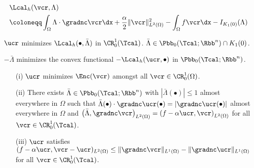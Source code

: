 \begin{frame}
  \begin{align*}
    &\Lcal_h(\vcr,\Lambda) \\
    &\coloneqq \int_\Omega\Lambda\cdot\gradnc\vcr\dx +
    \frac{\alpha}{2}\Vert \vcr\Vert^2_{L^2(\Omega)} -\int_\Omega f\vcr\dx
    - I_{K_1(0)}(\Lambda)
  \end{align*}
  
    \medskip
  {  
  $\ucr$ minimizes $\Lcal_h(\bullet, \bar\Lambda)$ in $\CR^1_0(\Tcal)$.
  $\bar\Lambda\in\Pbb_0(\Tcal;\Rbb^n)\cap K_1(0)$.}

  \medskip

  {  
  $-\bar\Lambda$ minimizes  the convex functional $-\Lcal_h(\ucr,\bullet)$ in
  $\Pbb_0(\Tcal;\Rbb^n)$.}
  
  \pause
  \begin{block}{}
  \begin{itemize}
    \item[(i)] $\ucr$ minimizes $\Enc(\vcr)$ amongst all $\vcr\in
      \CR^1_0(\Omega)$.
    \item[(ii)] There exists
      $\bar\Lambda\in\Pbb_0(\Tcal;\Rbb^n)$ with $|\bar\Lambda(\bullet)|\leq 1$
      almost everywhere in $\Omega$ such that
      {$\bar\Lambda(\bullet)\cdot\gradnc\ucr(\bullet)
        =
        |\gradnc\ucr(\bullet)|$} almost everywhere in 
        $\Omega$ and 
        {$\left(\bar\Lambda,\gradnc\vcr\right)_{L^2(\Omega)}
        = \left(f-\alpha\ucr, \vcr\right)_{L^2(\Omega)}$}
        for all $\vcr\in\CR^1_0(\Tcal)$.
      \pause
      \pause
      \pause
    \item[(iii)] $\ucr$ satisfies
      $
        (f-\alpha\ucr,\vcr-\ucr)_{L^2(\Omega)}\leq
        \Vert\gradnc\vcr\Vert_{L^1(\Omega)} -
        \Vert\gradnc\ucr\Vert_{L^1(\Omega)}
        $
      for all $\vcr\in\CR^1_0(\Tcal)$.
  \end{itemize}
    
  \end{block}
\end{frame}
